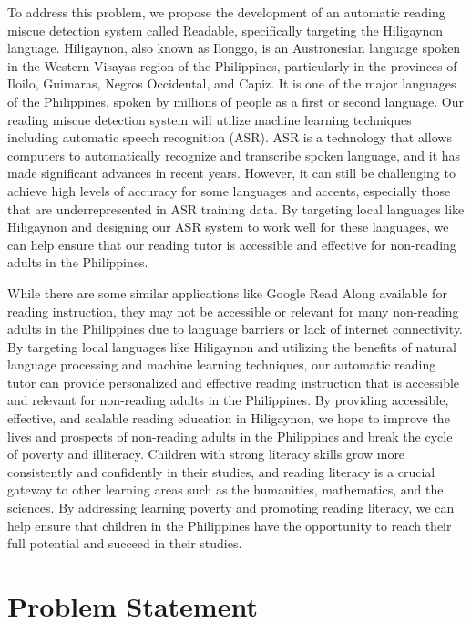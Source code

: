 To address this problem, we propose the development of an automatic reading miscue detection system called Readable, specifically targeting the Hiligaynon language. Hiligaynon, also known as Ilonggo, is an Austronesian language spoken in the Western Visayas region of the Philippines, particularly in the provinces of Iloilo, Guimaras, Negros Occidental, and Capiz. It is one of the major languages of the Philippines, spoken by millions of people as a first or second language.
Our reading miscue detection system will utilize machine learning techniques including automatic speech recognition (ASR). ASR is a technology that allows computers to automatically recognize and transcribe spoken language, and it has made significant advances in recent years. However, it can still be challenging to achieve high levels of accuracy for some languages and accents, especially those that are underrepresented in ASR training data. By targeting local languages like Hiligaynon and designing our ASR system to work well for these languages, we can help ensure that our reading tutor is accessible and effective for non-reading adults in the Philippines.

While there are some similar applications like Google Read Along available for reading instruction, they may not be accessible or relevant for many non-reading adults in the Philippines due to language barriers or lack of internet connectivity. By targeting local languages like Hiligaynon and utilizing the benefits of natural language processing and machine learning techniques, our automatic reading tutor can provide personalized and effective reading instruction that is accessible and relevant for non-reading adults in the Philippines. By providing accessible, effective, and scalable reading education in Hiligaynon, we hope to improve the lives and prospects of non-reading adults in the Philippines and break the cycle of poverty and illiteracy. Children with strong literacy skills grow more consistently and confidently in their studies, and reading literacy is a crucial gateway to other learning areas such as the humanities, mathematics, and the sciences. By addressing learning poverty and promoting reading literacy, we can help ensure that children in the Philippines have the opportunity to reach their full potential and succeed in their studies.

\section{Problem Statement}

